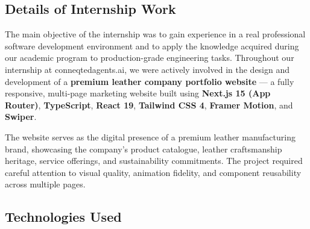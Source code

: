 \documentclass[12pt, oneside, a4paper]{book}
\begin{document}
\begin{doublespace}
\chapter{Details of Internship Work}

The main objective of the internship was to gain experience in a real professional
software development environment and to apply the knowledge acquired during our academic
program to production-grade engineering tasks. Throughout our internship at
conneqtedagents.ai, we were actively involved in the design and development of a
\textbf{premium leather company portfolio website} --- a fully responsive, multi-page
marketing website built using \textbf{Next.js 15 (App Router)}, \textbf{TypeScript},
\textbf{React 19}, \textbf{Tailwind CSS 4}, \textbf{Framer Motion}, and \textbf{Swiper}.

The website serves as the digital presence of a premium leather manufacturing brand,
showcasing the company's product catalogue, leather craftsmanship heritage, service
offerings, and sustainability commitments. The project required careful attention to
visual quality, animation fidelity, and component reusability across multiple pages.

\section{Technologies Used}


\end{doublespace}
\end{document}
